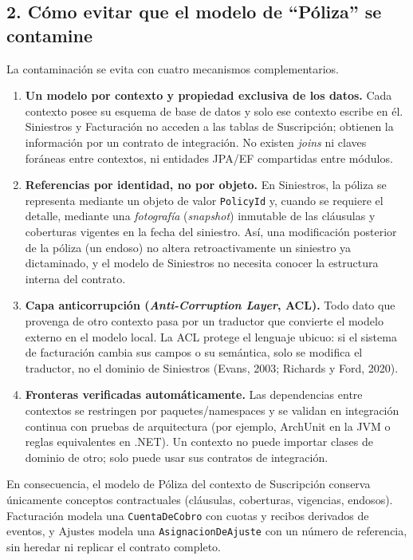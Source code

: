 \documentclass[11pt,a4paper]{article}
\begin{document}
\subsection*{2. Cómo evitar que el modelo de ``Póliza'' se contamine}

La contaminación se evita con cuatro mecanismos complementarios.

\begin{enumerate}[leftmargin=1.4em]
\item \textbf{Un modelo por contexto y propiedad exclusiva de los datos.} Cada contexto
posee su esquema de base de datos y solo ese contexto escribe en él. Siniestros y
Facturación no acceden a las tablas de Suscripción; obtienen la información por un
contrato de integración. No existen \emph{joins} ni claves foráneas entre contextos, ni
entidades JPA/EF compartidas entre módulos.

\item \textbf{Referencias por identidad, no por objeto.} En Siniestros, la póliza se
representa mediante un objeto de valor \texttt{PolicyId} y, cuando se requiere el detalle,
mediante una \emph{fotografía} (\emph{snapshot}) inmutable de las cláusulas y coberturas
vigentes en la fecha del siniestro. Así, una modificación posterior de la póliza (un
endoso) no altera retroactivamente un siniestro ya dictaminado, y el modelo de Siniestros
no necesita conocer la estructura interna del contrato.

\item \textbf{Capa anticorrupción (\emph{Anti-Corruption Layer}, ACL).} Todo dato que
provenga de otro contexto pasa por un traductor que convierte el modelo externo en el
modelo local. La ACL protege el lenguaje ubicuo: si el sistema de facturación cambia sus
campos o su semántica, solo se modifica el traductor, no el dominio de Siniestros
(Evans, 2003; Richards y Ford, 2020).

\item \textbf{Fronteras verificadas automáticamente.} Las dependencias entre contextos se
restringen por paquetes/namespaces y se validan en integración continua con pruebas de
arquitectura (por ejemplo, ArchUnit en la JVM o reglas equivalentes en .NET). Un contexto
no puede importar clases de dominio de otro; solo puede usar sus contratos de integración.
\end{enumerate}

En consecuencia, el modelo de Póliza del contexto de Suscripción conserva únicamente
conceptos contractuales (cláusulas, coberturas, vigencias, endosos). Facturación modela
una \texttt{CuentaDeCobro} con cuotas y recibos derivados de eventos, y Ajustes modela una
\texttt{AsignacionDeAjuste} con un número de referencia, sin heredar ni replicar el
contrato completo.
\end{document}
